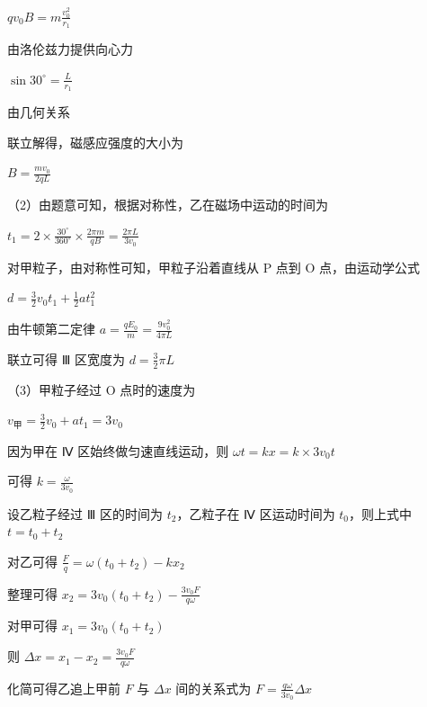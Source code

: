 \documentclass[\gkver]{gaokaozhenti}
\begin{document}
\begin{enumerate}
{

$qv_{0}B = m\frac{v_{0}^{2}}{r_{1}}$

由洛伦兹力提供向心力

$\sin30^\circ = \frac{L}{r_{1}}$

由几何关系

联立解得，磁感应强度的大小为

$B = \frac{mv_{0}}{2qL}$

（2）由题意可知，根据对称性，乙在磁场中运动的时间为

$t_{1} = 2 \times \frac{30^\circ}{360^\circ} \times \frac{2\pi m}{qB} = \frac{2\pi L}{3v_{0}}$

对甲粒子，由对称性可知，甲粒子沿着直线从 P 点到 O 点，由运动学公式

$d = \frac{3}{2}v_{0}t_{1} + \frac{1}{2}at_{1}^{2}$

由牛顿第二定律 $a = \frac{qE_{0}}{m} = \frac{9v_{0}^{2}}{4\pi L}$

联立可得 Ⅲ 区宽度为 $d = \frac{3}{2}\pi L$

（3）甲粒子经过 O 点时的速度为

$v_{\text{甲}} = \frac{3}{2}v_{0} + at_{1} = 3v_{0}$

因为甲在 Ⅳ 区始终做匀速直线运动，则 $\omega t = kx = k \times 3v_{0}t$

可得 $k = \frac{\omega}{3v_{0}}$

设乙粒子经过 Ⅲ 区的时间为 $t_{2}$，乙粒子在 Ⅳ 区运动时间为 $t_{0}$，则上式中 $t = t_{0} + t_{2}$

对乙可得 $\frac{F}{q} = \omega(t_{0} + t_{2}) - kx_{2}$

整理可得 $x_{2} = 3v_{0}(t_{0} + t_{2}) - \frac{3v_{0}F}{q\omega}$

对甲可得 $x_{1} = 3v_{0}(t_{0} + t_{2})$

则 $\Delta x = x_{1} - x_{2} = \frac{3v_{0}F}{q\omega}$

化简可得乙追上甲前 $F$ 与 $\Delta x$ 间的关系式为 $F = \frac{q\omega}{3v_{0}}\Delta x$
}

\end{enumerate}
\end{document}
